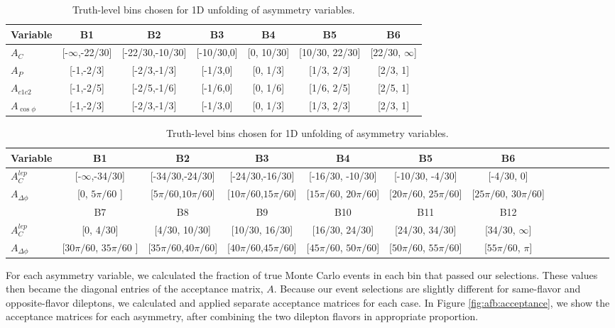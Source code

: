 \begin{table}%
\begin{center}
\caption{Truth-level bins chosen for 1D unfolding of asymmetry variables.}
\label{tab:afb:binning1d}
\begin{tabular}{l |  c  c  c  c  c  c }
\hline
Variable &  B1  &  B2 &  B3 &  B4 &  B5 &  B6\\ \hline
$A_{C}$  &        [-$\infty$,-22/30]  &  [-22/30,-10/30]  &  [-10/30,0]  &  [0, 10/30]  &  [10/30, 22/30]  &  [22/30, $\infty$] \\ \hline
$A_{P}$             &  [-1,-2/3]  &  [-2/3,-1/3]  &  [-1/3,0]  &  [0, 1/3]  &  [1/3, 2/3]  &  [2/3, 1] \\ \hline
$A_{c1c2}$        &  [-1,-2/5]  &  [-2/5,-1/6]  &  [-1/6,0]  &  [0, 1/6]  &  [1/6, 2/5]  &  [2/5, 1] \\ \hline
$A_{\cos\phi}$       &  [-1,-2/3]  &  [-2/3,-1/3]  &  [-1/3,0]  &  [0, 1/3]  &  [1/3, 2/3]  &  [2/3, 1] \\ \hline
\end{tabular}

\bigskip

\begin{tabular}{l |  c  c  c  c  c  c c c c c c c }
\hline
Variable &  B1  &  B2 &  B3 &  B4 &  B5 &  B6 \\ \hline
$A_C^{lep}$  &  [-$\infty$,-34/30]  &  [-34/30,-24/30]  &  [-24/30,-16/30]  &  [-16/30, -10/30]  &  [-10/30, -4/30]  &  [-4/30, 0] \\
\hline
$A_{\Delta\phi}$ &  [0, $5\pi/60$ ]  &  [$5\pi/60$,$10\pi/60$]  &  [$10\pi/60$,$15\pi/60$]  &  [$15\pi/60$, $20\pi/60$]  &  [$20\pi/60$, $25\pi/60$]  &  [$25\pi/60$, $30\pi/60$] \\
\hline
  &  B7 &  B8 &  B9 &  B10 &  B11 &  B12 \\ \hline
$A_C^{lep}$ & [0, 4/30] & [4/30, 10/30] & [10/30, 16/30] & [16/30, 24/30] & [24/30, 34/30] & [34/30, $\infty$] \\ \hline
$A_{\Delta\phi}$ & [$30\pi/60$, $35\pi/60$ ]  &  [$35\pi/60$,$40\pi/60$]  &  [$40\pi/60$,$45\pi/60$]  &  [$45\pi/60$, $50\pi/60$]  &  [$50\pi/60$, $55\pi/60$]  &  [$55\pi/60$, $\pi$] \\ \hline
\end{tabular}
\end{center}
\end{table}

For each asymmetry variable, we calculated the fraction of true
Monte Carlo events in each bin that passed our selections. These
values then became the diagonal entries of the acceptance matrix,
$A$. Because our event selections are slightly different for
same-flavor and opposite-flavor dileptons, we calculated and applied
separate acceptance matrices for each case. In Figure \ref{fig:afb:acceptance}, we
show the acceptance matrices for each asymmetry, after combining
the two dilepton flavors in appropriate proportion.

